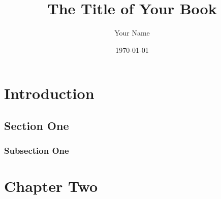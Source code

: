 \documentclass[12pt]{book}
\title{The Title of Your Book}
\author{Your Name}
\date{\today}
\begin{document}
\maketitle

\tableofcontents %

\chapter{Introduction}

\section{Section One}

\subsection{Subsection One}

\chapter{Chapter Two}
\end{document}
